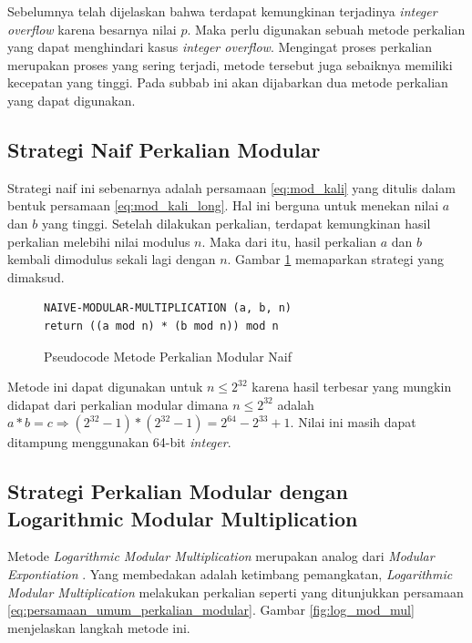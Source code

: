 Sebelumnya telah dijelaskan bahwa terdapat kemungkinan terjadinya \textit{integer overflow} karena besarnya nilai $ p $. Maka perlu digunakan sebuah metode perkalian yang dapat menghindari kasus \textit{integer overflow}. Mengingat proses perkalian merupakan proses yang sering terjadi, metode tersebut juga sebaiknya memiliki kecepatan yang tinggi. Pada subbab ini akan dijabarkan dua metode perkalian yang dapat digunakan.

\subsection{Strategi Naif Perkalian Modular}

Strategi naif ini sebenarnya adalah persamaan \eqref{eq:mod_kali} yang ditulis dalam bentuk persamaan \eqref{eq:mod_kali_long}. Hal ini berguna untuk menekan nilai $ a $ dan $ b $ yang tinggi. Setelah dilakukan perkalian, terdapat kemungkinan hasil perkalian melebihi nilai modulus $ n $. Maka dari itu, hasil perkalian $ a $ dan $ b $ kembali dimodulus sekali lagi dengan $ n $. Gambar \ref{psdo:modmul_naive} memaparkan strategi yang dimaksud.

\begin{figure}[h!]
\begin{lstlisting}[firstnumber=0,captionpos=b]
NAIVE-MODULAR-MULTIPLICATION (a, b, n)
return ((a mod n) * (b mod n)) mod n
\end{lstlisting}
\caption{Pseudocode Metode Perkalian Modular Naif}
\label{psdo:modmul_naive}
\end{figure}

Metode ini dapat digunakan untuk $ n \leq 2^{32} $ karena hasil terbesar yang mungkin didapat dari perkalian modular dimana $ n \leq 2^{32} $ adalah $ a*b = c \Rightarrow ( 2^{32}-1 ) * ( 2^{32}-1 ) = 2^{64} - 2^{33} + 1 $. Nilai ini masih dapat ditampung menggunakan 64-bit \textit{integer}.

\subsection{Strategi Perkalian Modular dengan Logarithmic Modular Multiplication} 
Metode \textit{Logarithmic Modular Multiplication} merupakan analog dari \textit{Modular Expontiation} \cite{geeks_modular_multiplication}. Yang membedakan adalah ketimbang pemangkatan, \textit{Logarithmic Modular Multiplication} melakukan perkalian seperti yang ditunjukkan persamaan \eqref{eq:persamaan_umum_perkalian_modular}. Gambar \ref{fig:log_mod_mul} menjelaskan langkah metode ini.


